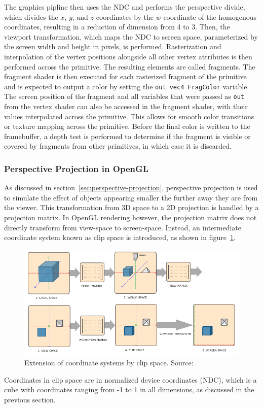 The graphics pipline then uses the NDC and performs the perspective divide,
which divides the $x$, $y$, and $z$ coordinates by the $w$ coordinate of the homogenous coordinates,
resulting in a reduction of dimension from 4 to 3.
Then, the viewport transformation, which maps the NDC to screen space,
parameterized by the screen width and height in pixels, is performed.
Rasterization and interpolation of the vertex positions alongside all other vertex attributes
is then performed across the primitive.
The resulting elements are called fragments.
The fragment shader is then executed for each rasterized fragment of the primitive and is expected to
output a color by setting the \texttt{out vec4 FragColor} variable.
The screen position of the fragment and all variables that were passed as \texttt{out} from the
vertex shader can also be accessed in the fragment shader, with their values interpolated across the primitive.
This allows for smooth color transitions or texture mapping across the primitive.
Before the final color is written to the framebuffer,
a depth test is performed to determine if the fragment is visible or covered by fragments from other primitives,
in which case it is discarded.~\cite{de_vries_learn_2020}

\subsubsection{Perspective Projection in OpenGL}

As discussed in section~\ref{sec:perspective-projection}, perspective projection is used
to simulate the effect of objects appearing smaller the further away they are from the viewer.
This transformation from 3D space to a 2D projection is handled by a projection matrix.
In OpenGL rendering however, the projection matrix does not directly transform from view-space to screen-space.
Instead, an intermediate coordinate system known as clip space is introduced, as shown in figure~\ref{fig:coordinate-systems-with-clip-space}.
\begin{figure}[h!]
    \centering
    \includegraphics[width=0.85\linewidth]{images/coordinate_systems}
    \caption{Extension of coordinate systems by clip space. Source: \cite{de_vries_learn_2020}}
    \label{fig:coordinate-systems-with-clip-space}
\end{figure}
Coordinates in clip space are in normalized device coordinates (NDC), which is a cube
with coordinates ranging from -1 to 1 in all dimensions, as discussed in the previous section.

